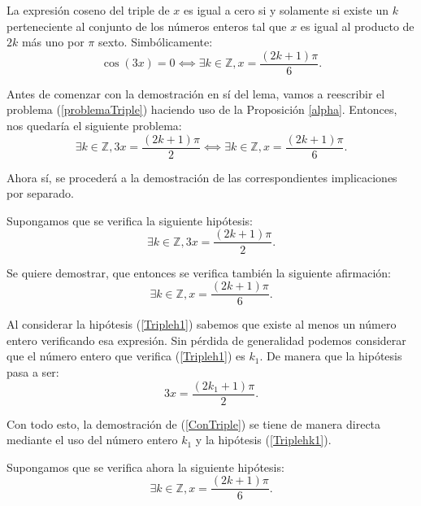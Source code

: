 \begin{lema}[SolucionCosenoTriple]\label{lemaCosenoTriple}
  La expresión coseno del triple de \(x\) es igual a cero si y solamente
  si existe un \(k\) perteneciente al conjunto de los números enteros
  tal que \(x\) es igual al producto de \(2k\) más uno por \(π\)
  sexto. Simbólicamente:
  \begin{equation}\label{problemaTriple}
    \cos(3x) = 0 ⟺ ∃ k ∈ ℤ, x = \frac{(2k+1)π}{6}.
  \end{equation}
\end{lema}

\begin{demostracion}
  Antes de comenzar con la demostración en sí del lema, vamos a
  reescribir el problema (\ref{problemaTriple}) haciendo uso de la
  Proposición \ref{alpha}. Entonces, nos quedaría el siguiente problema:
  \begin{equation}
    ∃ k ∈ ℤ, 3x = \frac{(2k+1)π}{2} ⟺ ∃ k ∈ ℤ, x = \frac{(2k+1)π}{6}.
  \end{equation}

  Ahora sí, se procederá a la demostración de las correspondientes
  implicaciones por separado.

  \noindent
  \framebox{\longrightarrow}
  Supongamos que se verifica la siguiente hipótesis:
  \begin{equation}\label{Tripleh1}\tag{h1}
    ∃ k ∈ ℤ, 3x = \frac{(2k+1)π}{2}.
  \end{equation}

  Se quiere demostrar, que entonces se verifica también la siguiente
  afirmación:
  \begin{equation}\label{ConTriple}
     ∃k ∈ ℤ, x = \frac{(2k+1)π}{6}.
   \end{equation}

   Al considerar la hipótesis (\ref{Tripleh1}) sabemos que existe al
   menos un número entero verificando esa expresión. Sin pérdida de
   generalidad podemos considerar que el número entero que verifica
   (\ref{Tripleh1}) es \(k_1\). De manera que la hipótesis pasa a ser:
   \begin{equation}\label{Triplehk1}\tag{hk1}
    3x = \frac{(2k_1+1)π}{2}.
  \end{equation}

  Con todo esto, la demostración de (\ref{ConTriple}) se tiene de manera
  directa mediante el uso del número entero \(k_1\) y la hipótesis
  (\ref{Triplehk1}).

   \noindent
   \framebox{\longleftarrow}
   Supongamos que se verifica ahora la siguiente hipótesis:
   \begin{equation}\label{Tripleh2}\tag{h2}
     ∃ k ∈ ℤ, x = \frac{(2k+1)π}{6}.
  \end{equation}


\end{demostracion}
